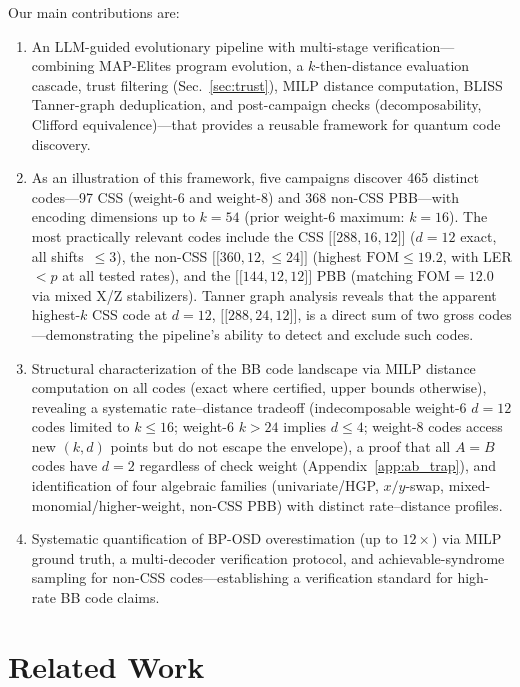 \documentclass[aps,prxquantum,twocolumn,superscriptaddress,nofootinbib]{revtex4-2}
\newcommand{\dblbrk}[1]{\ensuremath{\lbrack\!\lbrack #1 \rbrack\!\rbrack}}
\newcommand{\code}[1]{\dblbrk{#1}}
\newcommand{\FOM}{\ensuremath{\mathrm{FOM}}}
\begin{document}
Our main contributions are:
\begin{enumerate}
\item An LLM-guided evolutionary pipeline with multi-stage verification---combining MAP-Elites program evolution, a $k$-then-distance evaluation cascade, trust filtering (Sec.~\ref{sec:trust}), MILP distance computation, BLISS~\cite{junttila2007engineering} Tanner-graph deduplication, and post-campaign checks (decomposability, Clifford equivalence)---that provides a reusable framework for quantum code discovery.

\item As an illustration of this framework, five campaigns discover 465 distinct codes---97 CSS (weight-6 and weight-8) and 368 non-CSS PBB---with encoding dimensions up to $k = 54$ (prior weight-6 maximum: $k = 16$).
The most practically relevant codes include the CSS $\code{288,16,12}$ ($d = 12$ exact, all shifts~$\leq 3$), the non-CSS $\code{360,12,{\leq}24}$ (highest $\FOM \leq 19.2$, with LER ${<}p$ at all tested rates), and the $\code{144,12,12}$ PBB (matching $\FOM = 12.0$ via mixed X/Z stabilizers).
Tanner graph analysis reveals that the apparent highest-$k$ CSS code at $d=12$, $\code{288,24,12}$, is a direct sum of two gross codes---demonstrating the pipeline's ability to detect and exclude such codes. 

\item Structural characterization of the BB code landscape via MILP distance computation on all codes (exact where certified, upper bounds otherwise), revealing a systematic rate--distance tradeoff (indecomposable weight-6 $d = 12$ codes limited to $k \leq 16$; weight-6 $k > 24$ implies $d \leq 4$; weight-8 codes access new $(k,d)$ points but do not escape the envelope), a proof that all $A = B$ codes have $d = 2$ regardless of check weight (Appendix~\ref{app:ab_trap}), and identification of four algebraic families (univariate/HGP, $x/y$-swap, mixed-monomial/higher-weight, non-CSS PBB) with distinct rate--distance profiles.

\item Systematic quantification of BP-OSD overestimation (up to $12\times$) via MILP ground truth, a multi-decoder verification protocol, and achievable-syndrome sampling for non-CSS codes---establishing a verification standard for high-rate BB code claims.
\end{enumerate}

\section{Related Work}
\label{sec:related}
\end{document}
